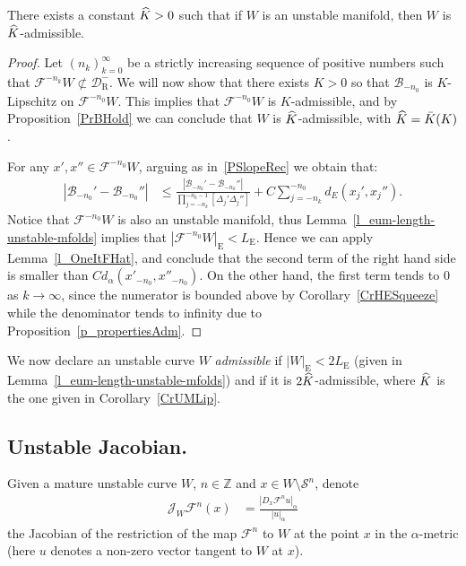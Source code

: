 \documentclass[10pt]{amsart}
\theoremstyle{definition}\newtheorem{defi}[theo]{Definition}\newtheorem{rema}[theo]{Remark}\newtheorem{exam}[theo]{Example}\newtheorem{exem}[theo]{Example}\newtheorem{nota}[theo]{Notation}
\newcommand{\integers}{\mathbb{Z}}
\newcommand{\cB}{\mathcal{B}}
\newcommand{\cm}{\mathcal{F}}
\newcommand{\cell}{\mathcal{D}}
\newcommand{\recoPrivate}{\mathrm{R}}
\newcommand{\reco}{{\cell^-_{\recoPrivate}}}
\newcommand{\eum}{_\text{E}}
\newcommand{\singPrivate}{\mathcal{S}}
\newcommand{\sing}[1]{\singPrivate^{#1}}
\newcommand{\admiss}{admissible}
\newcommand{\adm}{_{\alpha^{+}}}
\newcommand{\admName}{\alpha^{+}}
\newcommand{\jac}[1]{\mathcal{J}_{#1}}
\newcommand{\jacW}{\jac{W}}
\renewcommand{\admName}{\alpha}
\renewcommand{\adm}{_{\alpha}}
\let\oldhat\hat
\renewcommand*{\hat}[1]{\mathchoice{\widehat{#1}}{\widehat{#1}}{\oldhat{#1}}{\oldhat{#1}}}
\begin{document}
\begin{coro} \label{CrUMLip}
There exists a constant $\hat K > 0$ such that if $W$ is an unstable manifold, then $W$ is $\hat K$-\admiss{}.
\end{coro}
\begin{proof}
Let $(n_k)_{k = 0}^{\infty}$ be a strictly increasing sequence of positive numbers such that $\cm^{-n_k} W\not\subset \reco$. We will now show that there exists $K > 0$ so that $\cB_{-n_{0}}$ is $K$-Lipschitz on $\cm^{-n_{0}}W$. This implies that $\cm^{-n_{0}}W$ is $K$-admissible, and by Proposition~\ref{PrBHold} we can conclude that $W$ is $\hat K$-\admiss{}, with $\hat K = \bar K(K)$.

For any $x',x''\in \cm^{-n_{0}}W$, arguing as in~\eqref{PSlopeRec} we obtain that:
\begin{align}\label{SlopeBack}
|\cB_{-n_{0}}'-\cB_{-n_0}''| &\leq
\frac{|\cB_{-n_k}'-\cB_{-n_k}''|}{\prod_{j=-n_k}^{-n_{0}-1}
\left[\Delta_j' \Delta_j''\right]} +C \sum_{j=-n_k}^{-n_{0}} d_E\left(x_j', x_j''\right).
\end{align}
Notice that $\cm^{-n_{0}}W$ is also an unstable manifold, thus Lemma~\ref{l_eum-length-unstable-mfolds} implies that $|\cm^{-n_{0}}W|\eum < L\eum$. Hence we can apply Lemma~\ref{l_OneItFHat}, and conclude that the second term of the right hand side is smaller than $C d_\alpha(x'_{-n_{0}}, x''_{-n_{0}})$. On the other hand, the first term tends to $0$ as $k\to\infty$, since the numerator is bounded above by Corollary~\ref{CrHESqueeze} while the denominator tends to infinity due to Proposition~\ref{p_propertiesAdm}.
\end{proof}

We now declare an unstable curve $W$ \emph{\admiss{}} if $|W|\eum < 2L\eum$ (given in Lem\-ma~\ref{l_eum-length-unstable-mfolds}) and if it is $2\hat K$-admissible, where $\hat K$ is the one given in Corollary~\ref{CrUMLip}. 

\subsection{Unstable Jacobian.} Given a mature unstable curve $W$, $n\in\integers$ and $x\in W\setminus\sing n$, denote
\begin{align*}
\jacW \cm^{n}(x) &= \frac{|D_{x}\cm^{n}u|\adm}{|u|\adm}
\end{align*}
the Jacobian of the restriction of the map $\cm^{n}$ to $W$ at the point $x$ in the $\admName$-metric (here $u$ denotes a non-zero vector tangent to $W$ at $x$).
\end{document}
